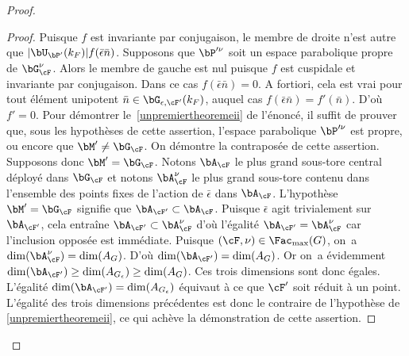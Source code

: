\begin{proof}
\begin{proof}
Puisque $f$ est invariante par conjugaison, le membre de droite n'est autre que $\vert \bU_{\bP'}(k_{F})\vert f(\bar{\epsilon}\bar{n})$. Supposons que $\bP^{\prime\nu}$ soit un espace parabolique propre de $\bG_{\cF}^{\nu}$. Alors le membre de gauche est nul puisque $f$ est cuspidale et invariante par conjugaison. Dans ce cas $f(\bar{\epsilon}\bar{n})=0$. A fortiori, cela est vrai pour tout élément unipotent $\bar{n}\in \bG_{\epsilon,\cF'}(k_{F})$, auquel cas $f(\bar{\epsilon}\bar{n})=f'(\bar{n})$. D'où $f'=0$. Pour démontrer le~\eqref{unpremiertheoremeii} de l'énoncé, il suffit de prouver que, sous les hypothèses de cette assertion, l'espace parabolique $\bP^{\prime\nu}$ est propre, ou encore que $\bM'\neq\bG_{\cF}$. On démontre la contraposée de cette assertion. Supposons donc $\bM'=\bG_{\cF}$. Notons $\bA_{\cF}$ le plus grand sous-tore central déployé dans $\bG_{\cF}$ et notons $\bA_{\cF}^{\nu}$ le plus grand sous-tore contenu dans l'ensemble des points fixes de l'action de $\bar{\epsilon}$ dans $\bA_{\cF}$. L'hypothèse $\bM'=\bG_{\cF}$ signifie que $\bA_{\cF'}\subset \bA_{\cF}$. Puisque $\bar{\epsilon}$ agit trivialement sur $\bA_{\cF'}$, cela entraîne $\bA_{\cF'}\subset \bA_{\cF}^{\nu}$ d'où l'égalité $\bA_{\cF'}= \bA_{\cF}^{\nu}$ car l'inclusion opposée est immédiate. Puisque $(\cF,\nu)\in \Fac_{\max}(G)$, on~a $\dim( \bA_{\cF}^{\nu})=\dim(A_{G})$. D'où $\dim(\bA_{\cF'})=\dim(A_{G})$. Or on~a évidemment $\dim(\bA_{\cF'})\geq \dim(A_{G_{\epsilon}})\geq \dim(A_{G})$. Ces trois dimensions sont donc égales. L'égalité $\dim(\bA_{\cF'})= \dim(A_{G_{\epsilon}})$ équivaut à ce que $\cF'$ soit réduit à un point. L'égalité des trois dimensions précédentes est donc le contraire de l'hypothèse de \eqref{unpremiertheoremeii}, ce qui achève la démonstration de cette assertion.


\end{proof}
\end{proof}
